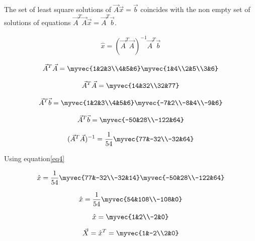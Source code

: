 \documentclass[journal,12pt,twocolumn]{IEEEtran}
\begin{document}
The set of least square solutions of $\vec{A}\vec{x}=\vec{b}$ coincides with the non empty set of solutions of equations $\vec{A}^T\vec{A}\vec{x}=\vec{A}^T\vec{b}.$ 

\begin{align}\label{eq4}
 \hat{x}=(\vec{A}^T\vec{A})^{-1}\vec{A}^T\vec{b} 
\end{align}

\begin{align*}
\vec{A}^T\vec{A}=\myvec{1&2&3\\4&5&6}\myvec{1&4\\2&5\\3&6}
\end{align*}

\begin{align*}
\vec{A}^T\vec{A}=\myvec{14&32\\32&77}
\end{align*}

\begin{align*}
\vec{A}^T\vec{b}=\myvec{1&2&3\\4&5&6}\myvec{-7&2\\-8&4\\-9&6}   
\end{align*}

\begin{align*}
\vec{A}^T\vec{b}=\myvec{-50&28\\-122&64}
\end{align*}

\begin{align*}
(\vec{A}^T\vec{A})^{-1}=\frac{1}{54}\myvec{77&-32\\-32&64} 
\end{align*}

Using equation\eqref{eq4} 

$$\hat{x}=\frac{1}{54}\myvec{77&-32\\-32&14}\myvec{-50&28\\-122&64}$$

$$\hat{x}=\frac{1}{54}\myvec{54&108\\-108&0}$$

$$\hat{x}=\myvec{1&2\\-2&0}$$

$$\vec{X}=\hat{x}^T=\myvec{1&-2\\2&0}$$
\end{document}
